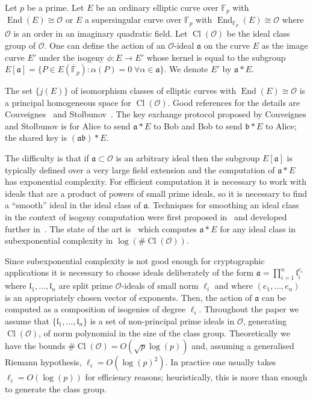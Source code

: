 \documentclass{llncs}
\newcommand{\F}{\mathbb{F}}
\newcommand{\Fpbar}{\overline{\mathbb{F}}_p}
\newcommand{\OO}{\mathcal{O}}
\DeclareMathOperator{\End}{End}
\DeclareMathOperator{\Cl}{Cl}
\renewcommand{\a}{\mathfrak{a}}
\renewcommand{\b}{\mathfrak{b}}
\renewcommand{\l}{\mathfrak{l}}
\begin{document}
Let $p$ be a prime.
Let $E$ be an ordinary elliptic curve over $\F_p$ with $\End(E) \cong \OO$ or $E$ a supersingular curve over $\F_p$ with $\End_{\F_p}(E) \cong \OO$ where $\OO$ is an order in an imaginary quadratic field.
Let $\Cl(\OO )$ be the ideal class group of $\OO$.
One can define the action of an $\OO$-ideal $\a$ on the curve $E$ as the image curve $E'$ under the isogeny $\phi : E \to E'$ whose kernel is equal to the subgroup $E[ \a ] = \{ P \in E( \Fpbar ) : \alpha(P) = 0 \; \forall \alpha \in \a \}$.
We denote $E'$ by $\a * E$.

The set $\{ j(E) \}$ of isomorphism classes of elliptic curves with $\End(E) \cong \OO$ is a principal homogeneous space for $\Cl(\OO )$.
Good references for the details are Couveignes~\cite{Couv06} and Stolbunov~\cite{Sto12}.
The key exchange protocol proposed by Couveignes and Stolbunov is for Alice to send $\a * E$ to Bob and Bob to send $\b * E$ to Alice; the shared key is $(\a\b) * E$.


The difficulty is that if $\a\subset\OO$ is an arbitrary ideal then the subgroup $E[ \a ]$ is typically defined over a very large field extension and the computation of $\a*E$ has exponential complexity.
For efficient computation it is necessary to work with ideals that are a product of powers of small prime ideals, so it is necessary to find a ``smooth'' ideal in the ideal class of $\a$.
Techniques for smoothing an ideal class in the context of isogeny computation were first proposed in~\cite{GHS02} and developed further in~\cite{BCL08,JS10,biasse_fieker_jacobson_2016}.
The state of the art is~\cite{biasse_fieker_jacobson_2016} which computes $\a * E$ for any ideal class in subexponential complexity in $\log(\#\Cl(\OO))$.

Since subexponential complexity is not good enough for cryptographic applications it is necessary to choose ideals deliberately of the form $\a = \prod_{i=1}^n \l_i^{e_i}$ where $\l_1, \dots, \l_n$ are split prime $\OO$-ideals of small norm $\ell_i$ and where $(e_1, \dots, e_n)$ is an appropriately chosen vector of exponents.
Then, the action of $\a$ can be computed as a composition of isogenies of degree $\ell_i$.
Throughout the paper we assume that $\{ \l_1, \dots, \l_n \}$ is a set of non-principal prime ideals in $\OO$, generating $\Cl(\OO)$, of norm polynomial in the size of the class group.
Theoretically we have the bounds $\#\Cl(\OO) = O( \sqrt{p} \log(p) )$ and, assuming a generalised Riemann hypothesis, $\ell_i = O( \log(p)^2 )$.
In practice one usually takes $\ell_i=O(\log(p))$ for efficiency reasons; heuristically, this is more than enough to generate the class group.
\end{document}
